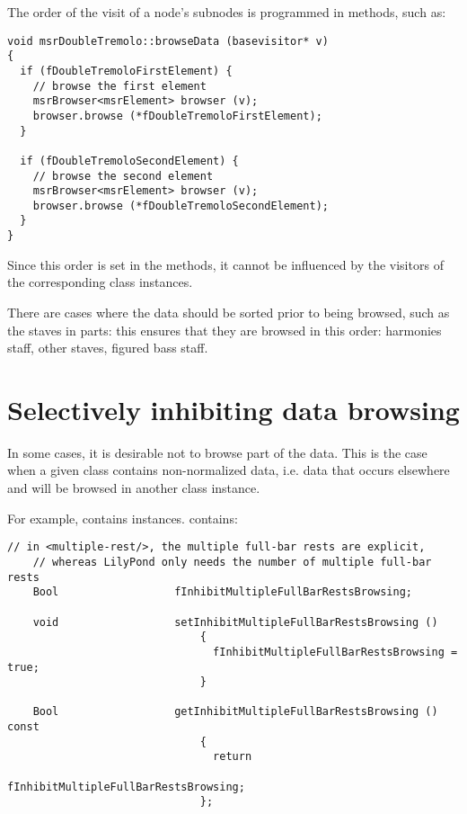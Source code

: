 The order of the visit of a node's subnodes is programmed in  methods, such as:
\begin{lstlisting}[language=CPlusPlus,caption={{\tt msrDoubleTremolo::browseData (basevisitor* v)}}]
void msrDoubleTremolo::browseData (basevisitor* v)
{
  if (fDoubleTremoloFirstElement) {
    // browse the first element
    msrBrowser<msrElement> browser (v);
    browser.browse (*fDoubleTremoloFirstElement);
  }

  if (fDoubleTremoloSecondElement) {
    // browse the second element
    msrBrowser<msrElement> browser (v);
    browser.browse (*fDoubleTremoloSecondElement);
  }
}
\end{lstlisting}

Since this order is set in the  methods, it cannot be influenced by the visitors of the corresponding class   instances.

There are cases where the data should be sorted prior to being browsed, such as the staves in parts: this ensures that they are browsed in this order: harmonies staff, other staves, figured bass staff.


\section{Selectively inhibiting data browsing}

In some cases, it is desirable not to browse part of the data. This is the case when a given class   contains non-normalized data, i.e. data that occurs elsewhere and will be browsed in another class   instance.

For example,  contains  instances.  contains:
\begin{lstlisting}[language=CPlusPlus]
    // in <multiple-rest/>, the multiple full-bar rests are explicit,
    // whereas LilyPond only needs the number of multiple full-bar rests
    Bool                  fInhibitMultipleFullBarRestsBrowsing;

    void                  setInhibitMultipleFullBarRestsBrowsing ()
                              {
                                fInhibitMultipleFullBarRestsBrowsing = true;
                              }

    Bool                  getInhibitMultipleFullBarRestsBrowsing () const
                              {
                                return
                                  fInhibitMultipleFullBarRestsBrowsing;
                              };
\end{lstlisting}

